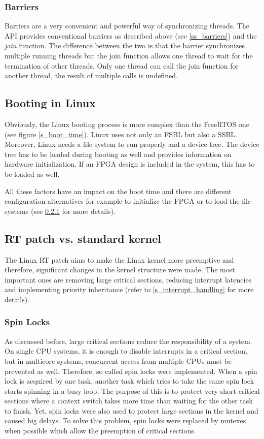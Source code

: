 \subsubsection{Barriers}
Barriers are a very convenient and powerful way of synchronizing threads. 
The \ac{API} provides conventional barriers as described above (see \ref{ss_barriers}) and the \textit{join} function.
The difference between the two is that the barrier synchronizes multiple running threads but the join function allows one thread to wait for the termination of other threads.
Only one thread can call the join function for another thread, the result of multiple calls is undefined.

\subsection{Booting in Linux}
Obviously, the Linux booting process is more complex than the FreeRTOS one (see figure \ref{s_boot_time}). 
Linux uses not only an \ac{FSBL} but also a \ac{SSBL}.
Moreover, Linux needs a file system to run properly and a device tree.
The device tree has to be loaded during booting as well and provides information on hardware initialization.
If an \ac{FPGA} design is included in the system, this has to be loaded as well.
\par
All these factors have an impact on the boot time and there are different configuration alternatives for example to initialize the \ac{FPGA} or to load the file systems (see \ref{} for more details). 

\subsection{RT patch vs. standard kernel}
The Linux RT patch aims to make the Linux kernel more preemptive and therefore, significant changes in the kernel structure were made.
The most important ones are removing large critical sections, reducing interrupt latencies and implementing priority inheritance (refer to \ref{s_interrupt_handling} for more details).

\subsubsection{Spin Locks}
As discussed before, large critical sections reduce the responsibility of a system.
On single \ac{CPU} systems, it is enough to disable interrupts in a critical section, but in multicore systems, concurrent access from multiple \acp{CPU} must be prevented as well.
Therefore, so called spin locks were implemented. 
When a spin lock is acquired by one task, another task which tries to take the same spin lock starts spinning in a busy loop.
The purpose of this is to protect very short critical sections where a context switch takes more time than waiting for the other task to finish.
Yet, spin locks were also used to protect large sections in the kernel and caused big delays.
To solve this problem, spin locks were replaced by mutexes when possible which allow the preemption of critical sections.   

